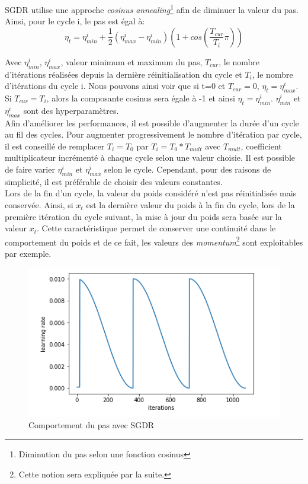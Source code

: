 \noindent SGDR utilise une approche \textit{cosinus annealing}\footnote{Diminution du pas selon une fonction cosinus} afin de diminuer la valeur du pas. Ainsi, pour le cycle i, le pas est égal à:
$$\eta_t=\eta_{min}^i+\frac{1}{2}(\eta_{max}^i-\eta_{min}^i)(1+cos(\frac{T_{cur}}{T_i}\pi))$$

\noindent Avec $\eta_{min}^i$, $\eta_{max}^i$, valeur minimum et maximum du pas, $T_{cur}$, le nombre d'itérations réalisées depuis la dernière réinitialisation du cycle et $T_i$, le nombre d'itérations du cycle i. Nous pouvons ainsi voir que si t=0 et $T_{cur}=0$, $\eta_t=\eta_{max}^i$. Si $T_{cur}=T_i$, alors la composante cosinus sera égale à -1 et ainsi $\eta_t=\eta_{min}^i$. $\eta_{min}^i$ et $\eta_{max}^i$ sont des hyperparamètres.\\

\noindent Afin d'améliorer les performances, il est possible d'augmenter la durée d'un cycle au fil des cycles. Pour augmenter progressivement le nombre d'itération par cycle, il est conseillé de remplacer $T_i=T_0$ par $T_i=T_0*T_{mult}$ avec $T_{mult}$, coefficient multiplicateur incrémenté à chaque cycle selon une valeur choisie. Il est possible de faire varier $\eta_{min}^i$ et $\eta_{max}^i$ selon le cycle. Cependant, pour des raisons de simplicité, il est préférable de choisir des valeurs constantes.\\

\noindent Lors de la fin d'un cycle, la valeur du poids considéré n'est pas réinitialisée mais conservée. Ainsi, si $x_t$ est la dernière valeur du poids à la fin du cycle, lors de la première itération du cycle suivant, la mise à jour du poids sera basée sur la valeur $x_t$. Cette caractéristique permet de conserver une continuité dans le comportement du poids et de ce fait, les valeurs des \textit{momentum}\footnote{Cette notion sera expliquée par la suite.} sont exploitables par exemple.

\begin{figure}
    \centering
    \includegraphics[scale=0.4]{./tex/fondamentaux/sgdr.png}
    \caption{Comportement du pas avec SGDR}
    \label{sgdr}
\end{figure}

